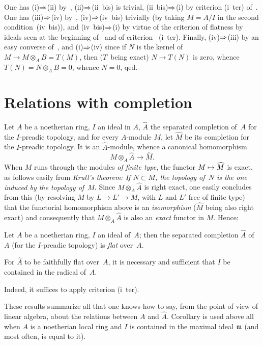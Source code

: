 One has (i)$\To$(ii) by~, (ii)$\To$(ii~bis) is trivial,
(ii~bis)$\To$(i) by criterion (i~ter) of~. One has
(iii)$\To$(iv) by~, (iv)$\To$(iv~bis) trivially (by
taking $M=A/I$ in the second condition~(iv~bis)), and
(iv~bis)$\To$(i) by virtue of the criterion of flatness by ideals seen
at the beginning of~ and of criterion ~(i~ter).
Finally, (iv)$\To$(iii) by an easy converse of~, and
(i)$\To$(iv) since
if $N$ is the kernel of~$M \to M \otimes_{A}B =T(M)$, then ($T$~being
exact) $N \to T(N)$ is zero, whence $T(N)=N \otimes_{A}B =0$, whence
$N=0$, qed.

\section{Relations with completion}
\label{IV.3}
Let $A$ be a noetherian ring, $I$ an ideal in $A$, $\widehat{A}$ the
separated completion of~$A$ for the $I$-preadic topology, and for
every $A$-module $M$, let $\widehat{M}$ be its completion for the
$I$-preadic topology. It is an $\widehat{A}$-module, whence a
canonical homomorphism
$$
M \otimes_A \widehat{A} \to \widehat{M}.
$$
When $M$ runs through the modules \emph{of finite type}, the functor
$M \mto \widehat{M}$ is exact, as follows easily from \emph{Krull's
theorem: If $N \subset M$, the topology of~$N$ is the one induced by
the topology of~$M$}. Since $M \otimes_A \widehat{A}$ is right exact,
one easily concludes from this (by resolving $M$ by $L \to L' \to M$,
with $L$ and $L'$ free of finite type) that the functorial
homomorphism above is an \emph{isomorphism} ($\widehat{M}$ being also
right exact) and consequently that $M \otimes_A \widehat{A}$ is also
an \emph{exact} functor in $M$. Hence:
\begin{proposition}
\label{IV.3.1}
Let $A$ be a noetherian ring, $I$ an ideal of~$A$; then the separated
completion $\widehat{A}$ of~$A$ (for the $I$-preadic topology) is
\emph{flat} over~$A$.
\end{proposition}

\begin{corollary}
\label{IV.3.2}
For $\widehat{A}$ to be faithfully flat over~$A$, it is necessary and
sufficient that $I$ be contained in the radical of~$A$.
\end{corollary}

Indeed, it suffices to apply criterion  (i~ter).

These results summarize all that one knows how to say, from the point
of view of linear algebra, about the relations between $A$ and
$\widehat{A}$. Corollary  is used above all when $A$ is a
noetherian local ring and $I$ is contained in the maximal ideal
$\mathfrak{m}$ (and most often, is equal to it).

